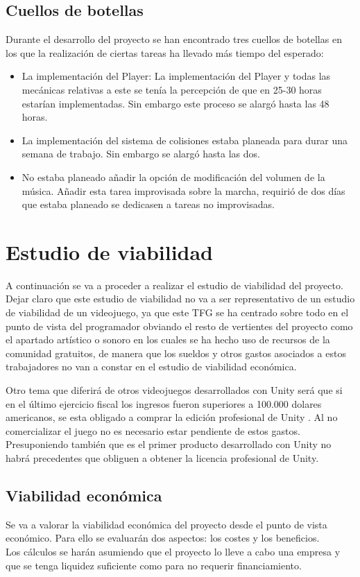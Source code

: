 \subsection{Cuellos de botellas}
Durante el desarrollo del proyecto se han encontrado tres cuellos de botellas en los que la realización de ciertas tareas ha llevado más tiempo del esperado:
\begin{itemize}
\item
La implementación del Player: La implementación del Player y todas las mecánicas relativas a este se tenía la percepción de que en 25-30 horas estarían implementadas. Sin embargo este proceso se alargó hasta las 48 horas.
\item
La implementación del sistema de colisiones estaba planeada para durar una semana de trabajo. Sin embargo se alargó hasta las dos.
\item
No estaba planeado añadir la opción de modificación del volumen de la música. Añadir esta tarea improvisada sobre la marcha, requirió de dos días que estaba planeado se dedicasen a tareas no improvisadas.
\end{itemize} 

\section{Estudio de viabilidad}
A continuación se va a proceder a realizar el estudio de viabilidad del proyecto. Dejar claro que este estudio de viabilidad no va a ser representativo de un estudio de viabilidad de un videojuego, ya que este TFG se ha centrado sobre todo en el punto de vista del programador obviando el resto de vertientes del proyecto como el apartado artístico o sonoro en los cuales se ha hecho uso de recursos de la comunidad gratuitos, de manera que los sueldos y otros gastos asociados a estos trabajadores no van a constar en el estudio de viabilidad económica.

Otro tema que diferirá de otros videojuegos desarrollados con Unity será que si en el último ejercicio fiscal los ingresos fueron superiores a 100.000 dolares americanos, se esta obligado a comprar la edición profesional de Unity \cite{FAQUnity}. Al no comercializar el juego no es necesario estar pendiente de estos gastos. Presuponiendo también que es el primer producto desarrollado con Unity no habrá precedentes que obliguen a obtener la licencia profesional de Unity.

\subsection{Viabilidad económica}
Se va a valorar la viabilidad económica del proyecto desde el punto de vista económico. Para ello se evaluarán dos aspectos: los costes y los beneficios.\\
Los cálculos se harán asumiendo que el proyecto lo lleve a cabo una empresa y que se tenga liquidez suficiente como para no requerir financiamiento.

